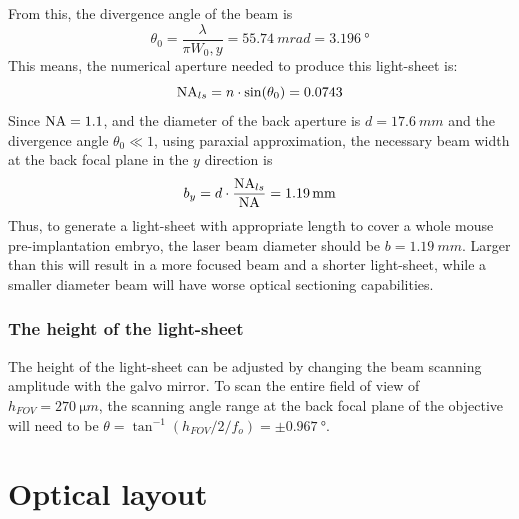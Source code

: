       From this, the divergence angle of the beam is
      \begin{equation}
        \theta_0 = \frac{\lambda}{\pi W_0,y} = \SI{55.74}{mrad} = \SI{3.196}{\degree}
      \end{equation}
      This means, the numerical aperture needed to produce this light-sheet is:
      \begin{equation}
        \operatorname{NA}_{ls} = n\cdot \sin(\theta _0) = 0.0743
      \end{equation}
      Since $\operatorname{NA}=1.1$, and the diameter of the back aperture is $d=\SI{17.6}{mm}$ and the divergence angle $\theta_0 \ll 1$, using paraxial approximation, the necessary beam width at the back focal plane in the $y$ direction is
      \begin{equation}
        b_y = d \cdot \frac{\operatorname{NA}_{ls}}{\operatorname{NA}} = \SI{1.19}{mm}
      \end{equation}
      Thus, to generate a light-sheet with appropriate length to cover a whole mouse pre-implantation embryo, the laser beam diameter should be $b=\SI{1.19}{mm}$. Larger than this will result in a more focused beam and a shorter light-sheet, while a smaller diameter beam will have worse optical sectioning capabilities.

    \subsubsection{The height of the light-sheet}
    
    The height of the light-sheet can be adjusted by changing the beam scanning amplitude with the galvo mirror. To scan the entire field of view of $h_{FOV} = \SI{270}{\micro m}$, the scanning angle range at the back focal plane of the objective will need to be $ \theta = \tan^{-1}(h_{FOV}/2/f_o) = \pm \SI{0.967}{\degree}$.


      


\section{Optical layout}
  

